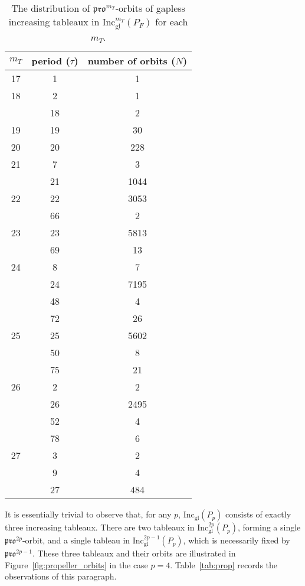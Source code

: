 \documentclass[12pt]{amsart}
\theoremstyle{definition}
\theoremstyle{remark}
\numberwithin{equation}{section}
\newcommand{\inc}{\ensuremath{\mathrm{Inc}}}
\newcommand{\incgl}{\inc_{\mathrm{gl}}}
\newcommand{\pro}{\mathfrak{pro}}
\begin{document}
\begin{table}[h]
\begin{tabular}{|c|c|c|}
\hline
${m_T}$ & period ($\tau$) & number of orbits ($N$) \\
  \hline
  17 & 1 & 1\\
  \hline
  18 & 2 & 1\\ \cline{2-3}
   & 18 & 2 \\
   \hline
  19 & 19 & 30\\
  \hline
  20 & 20 & 228\\
  \hline
    21 & 7 & 3\\ \cline{2-3}
    & 21 & 1044 \\
  \hline
  22 & 22 & 3053\\\cline{2-3}
   & 66 & 2\\
  \hline
  23 & 23 & 5813\\ \cline{2-3}
  & 69 & 13 \\
   \hline
  24 & 8 & 7\\\cline{2-3}
   & 24 & 7195\\\cline{2-3}
   & 48 & 4\\\cline{2-3}
   & 72 & 26\\
   \hline
  25 & 25 & 5602\\ \cline{2-3}
  & 50 & 8 \\ \cline{2-3}
  & 75 & 21 \\
   \hline
  26 & 2 & 2\\ \cline{2-3}
  & 26 & 2495 \\ \cline{2-3}
  & 52 & 4 \\ \cline{2-3}
  & 78 & 6 \\
   \hline
 27 & 3 & 2\\ \cline{2-3}
  & 9 & 4 \\ \cline{2-3}
  & 27 & 484 \\
  \hline
\end{tabular}
\caption{The distribution of $\pro^{m_T}$-orbits of gapless increasing tableaux in $\incgl^{m_T}(P_F)$ for each ${m_T}$.}
\label{tab:E7}
\end{table}

It is essentially trivial to observe that, for any $p$, $\incgl(P_p)$ consists of exactly three increasing tableaux. There are two tableaux in $\incgl^{2p}(P_p)$, forming a single $\pro^{2p}$-orbit, and a single tableau in $\incgl^{2p-1}(P_p)$, which is necessarily fixed by $\pro^{2p-1}$. These three tableaux and their orbits are illustrated in Figure~\ref{fig:propeller_orbits} in the case $p=4$. Table~\ref{tab:prop} records the observations of this paragraph.
\end{document}

